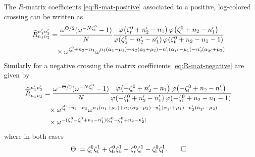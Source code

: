 \documentclass{sl2ams}
\numberwithin{equation}{section}
\begin{document}
\begin{lemma}
  \label{thm:R-mat-phi-form}
  The \(R\)-matrix coefficients \eqref{eq:R-mat-positive} associated to a positive, log-colored crossing can be written as
  \begin{equation}
    \label{eq:R-mat-positive-phi-form}
    \begin{aligned}
      \rmat{n_1}{n_2}{n_1'}{n_2'}
    &=
    \frac{
      \omega^{\Theta/2}
      (\omega^{-\nr \zeta_{\lW}^{0}} -1)
      }{
      \nr 
    }
    \frac{
      \pf{\zeta_{\lN}^0 + n_2' - n_1}
      \pf{\zeta_{\lS}^0 + n_2 - n_1'}
      }{
      \pf{\zeta_{\lE}^0 + n_2' - n_1'}
      \pf{\zeta_{\lW}^0 + n_2 - n_1 - 1}
    }
    \\
    &\phantom{=}\times
    \omega^{\zeta_{\lW}^{0} + n_{2} - n_{1}}
    \omega^{
      n_1(\alpha_{1}  -\mu_1)
      +
      n_2(\alpha_{2} + \mu_2)
      -
      n_1'(\alpha_{1'} -\mu_1)
      -
      n_2'(\alpha_{2'} + \mu_2)
    }
  \end{aligned}
  \end{equation}
  Similarly for a negative crossing the matrix coefficients \eqref{eq:R-mat-negative} are given by 
  \begin{equation}
    \label{eq:R-mat-negative-phi-form}
    \begin{aligned}
      \rmatm{n_1}{n_2}{n_1'}{n_2'}
    &=
    \frac{
      \omega^{-\Theta/2}
      (\omega^{-\nr \zeta_{\lW}^{0}} -1)
      }{
      \nr 
    }
    \frac{
      \pf{-\zeta_{\lN}^0 + n_2' - n_1}
      \pf{-\zeta_{\lS}^0 + n_2 - n_1'}
      }{
      \pf{-\zeta_{\lE}^0 + n_2' - n_1'}
      \pf{-\zeta_{\lW}^0 + n_2 - n_1 - 1}
    }
    \\
    &\phantom{=}\times
    \omega^{\zeta_{\lW}^{0} + n_{1} - n_{2}}
    \omega^{
      n_1(\alpha_{1}  + \mu_1)
      +
      n_2(\alpha_{2} - \mu_2)
      -
      n_1'(\alpha_{1'} + \mu_1)
      -
      n_2'(\alpha_{2'} - \mu_2)
    }
    \\
    &\phantom{=}\times
    \omega^{
      -
      (\zeta_{\lW}^{0} - \zeta_{\lS}^{0} + n_{1} - n_{1}')
      (\zeta_{\lW}^{0} - \zeta_{\lN}^{0} + n_{2} - n_{2}')
    }
    \end{aligned}
  \end{equation}
  where in both cases
  \begin{equation*}
    \Theta
    \mathrel{:=}
    \zeta_{\mathrm{t}}^{0} \zeta_{\mathrm{t}}^{1}
    +
    \zeta_{\mathrm{b}}^{0} \zeta_{\mathrm{b}}^{1}
    -
    \zeta_{\mathrm{r}}^{0} \zeta_{\mathrm{r}}^{1}
    -
    \zeta_{\mathrm{l}}^{0} \zeta_{\mathrm{l}}^{1}
    .
    \qedhere
  \end{equation*}
\end{lemma}
\end{document}
